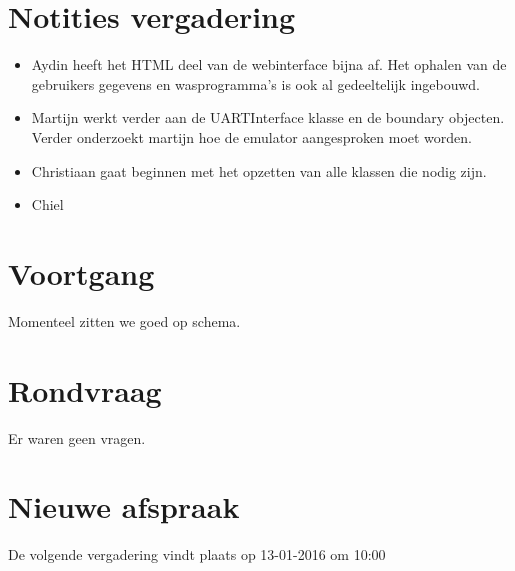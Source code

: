 \documentclass[dutch]{hu}
\begin{document}
\section{Notities vergadering}
\begin{itemize}

\item Aydin heeft het HTML deel van de webinterface bijna af. Het ophalen van de gebruikers gegevens en wasprogramma's is ook al gedeeltelijk ingebouwd.
\item Martijn werkt verder aan de UARTInterface klasse en de boundary objecten. Verder onderzoekt martijn hoe de emulator aangesproken moet worden.
\item Christiaan gaat beginnen met het opzetten van alle klassen die nodig zijn.
\item Chiel 

\end{itemize}

\section{Voortgang}
Momenteel zitten we goed op schema.

\section{Rondvraag}
Er waren geen vragen.

\section{Nieuwe afspraak}
De volgende vergadering vindt plaats op 13-01-2016 om 10:00
\end{document}
